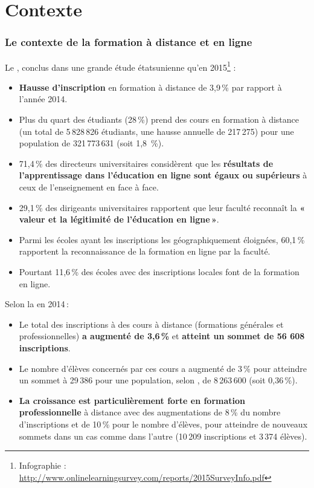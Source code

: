 \documentclass{beamer}
\begin{document}
	\section{Contexte} 
		\begin{frame}[allowframebreaks]
			\frametitle{Le contexte de la formation à distance et en ligne}
			Le \citet{OLC2015a}, conclus dans une grande étude étatsunienne qu'en 2015\footnote{Infographie : \url {http://www.onlinelearningsurvey.com/reports/2015SurveyInfo.pdf} } :
			\begin {itemize}
				\item \textbf{Hausse d'inscription} en formation à distance de 3,9\,\% par rapport à l'année 2014.
				\item Plus du {quart des étudiants (28\,\%) prend des cours en formation à distance} (un  total de 5\,828\,826 étudiants, une hausse annuelle de 217\,275)  pour une population de 321\,773\,631 (soit 1,8 \,\%).
				\item 71,4\,\% des directeurs universitaires considèrent que les \textbf{résultats de l'apprentissage dans l'éducation en ligne sont égaux ou supérieurs} à ceux de l'enseignement en face à face.
				\item 29,1\,\% des dirigeants universitaires rapportent que leur faculté reconnaît la \textbf{«\,valeur et la légitimité de l'éducation en ligne\,»}. 
				\item Parmi les écoles ayant les inscriptions les géographiquement éloignées, 60,1\,\% rapportent la reconnaissance de la formation en ligne par la faculté. 
				\item Pourtant 11,6\,\% des écoles avec des inscriptions locales font de la formation en ligne. 
			\end{itemize}
			\framebreak
			{Selon la \citet{sofad2015a} en 2014\,:} 
			
			\begin {itemize}
				\item Le total des inscriptions à des cours à distance (formations générales et professionnelles) \textbf{a augmenté de 3,6\,\%} et \textbf{atteint un sommet de 56 608 inscriptions}.
				\item Le nombre d’élèves concernés par ces cours a augmenté de 3\,\% pour atteindre un sommet à 29\,386 pour une population, selon \citet{is2015a}, de 8\,263\,600 (soit 0,36\,\%).
				\item \textbf{La croissance est particulièrement forte en formation professionnelle} à distance avec des augmentations de 8\,\% du nombre d’inscriptions et de 10\,\% pour le nombre d’élèves, pour atteindre de nouveaux sommets dans un cas comme dans l’autre (10\,209 inscriptions et 3\,374 élèves).
				
			\end{itemize}
		\end{frame}
		
\end{document}

